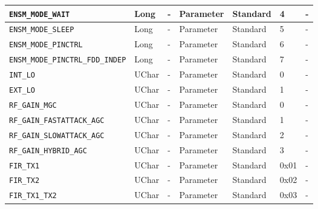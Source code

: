 \documentclass{article}
\begin{document}
\begin{landscape}
\begin{scriptsize}
\begin{longtable}{|p{3.6cm}|p{8.1cm}|p{1.4cm}|p{1.3cm}|p{1.4cm}|p{2.5cm}|p{3.6cm}|}
			\hline
      \verb+ENSM_MODE_WAIT+            & Long         & -               & Parameter             & Standard                         & 4                   & - \\
			\hline
      \verb+ENSM_MODE_SLEEP+           & Long         & -               & Parameter             & Standard                         & 5                   & - \\
			\hline
      \verb+ENSM_MODE_PINCTRL+         & Long         & -               & Parameter             & Standard                         & 6                   & - \\
			\hline
      \verb+ENSM_MODE_PINCTRL_FDD_INDEP+&Long         & -               & Parameter             & Standard                         & 7                   & - \\
			\hline
      \verb+INT_LO+                    & UChar        & -               & Parameter             & Standard                         & 0                   & - \\
			\hline
      \verb+EXT_LO+                    & UChar        & -               & Parameter             & Standard                         & 1                   & - \\
			\hline
      \verb+RF_GAIN_MGC+               & UChar        & -               & Parameter             & Standard                         & 0                   & - \\
			\hline
      \verb+RF_GAIN_FASTATTACK_AGC+    & UChar        & -               & Parameter             & Standard                         & 1                   & - \\
			\hline
      \verb+RF_GAIN_SLOWATTACK_AGC+    & UChar        & -               & Parameter             & Standard                         & 2                   & - \\
			\hline
      \verb+RF_GAIN_HYBRID_AGC+        & UChar        & -               & Parameter             & Standard                         & 3                   & - \\
			\hline
      \verb+FIR_TX1+                   & UChar        & -               & Parameter             & Standard                         & 0x01                & - \\
			\hline
      \verb+FIR_TX2+                   & UChar        & -               & Parameter             & Standard                         & 0x02                & - \\
			\hline
      \verb+FIR_TX1_TX2+               & UChar        & -               & Parameter             & Standard                         & 0x03                & - \\

\end{longtable}
\end{scriptsize}
\end{landscape}
\end{document}

